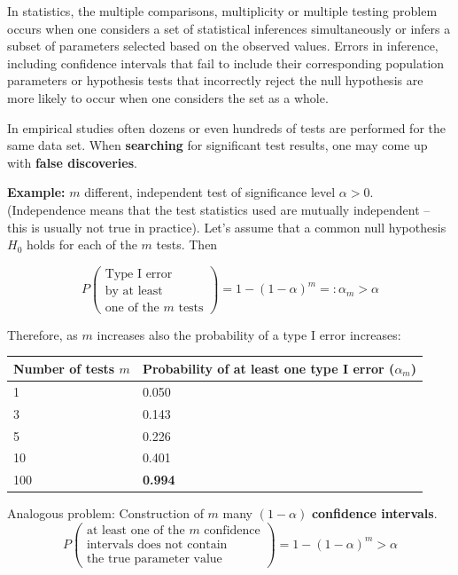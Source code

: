 \documentclass[]{book}
\theoremstyle{definition}
\theoremstyle{definition}
\theoremstyle{definition}
\theoremstyle{remark}
\begin{document}
In statistics, the multiple comparisons, multiplicity or multiple testing problem occurs when one considers a set of statistical inferences simultaneously or infers a subset of parameters selected based on the observed values. Errors in inference, including confidence intervals that fail to include their corresponding population parameters or hypothesis tests that incorrectly reject the null hypothesis are more likely to occur when one considers the set as a whole.

In empirical studies often dozens or even hundreds of tests are performed for the same data set. When \textbf{searching} for
significant test results, one may come up with \textbf{false discoveries}.

\textbf{Example:} \(m\) different, independent test of significance level \(\alpha>0\). (Independence means that the test statistics used are mutually independent -- this is usually not true in practice). Let's assume that a common null hypothesis \(H_0\) holds for each of the \(m\) tests. Then

\[
P \begin{pmatrix}
      \text{Type I error}\\
      \text{by at least} \\
      \text{one of the $m$ tests}
  \end{pmatrix}
= 1 - (1 - \alpha)^m =: \alpha_m>\alpha
\]

Therefore, as \(m\) increases also the probability of a type I error increases:

\begin{longtable}[]{@{}ll@{}}
\toprule
Number of tests \(m\) & Probability of at least one type I error (\(\alpha_m\))\tabularnewline
\midrule
\endhead
1 & 0.050\tabularnewline
3 & 0.143\tabularnewline
5 & 0.226\tabularnewline
10 & 0.401\tabularnewline
100 & \textbf{0.994}\tabularnewline
\bottomrule
\end{longtable}

Analogous problem: Construction of \(m\) many \((1-\alpha)\) \textbf{confidence intervals}.
\[
P \begin{pmatrix}
      \text{at least one of the $m$ confidence} \\
      \text{intervals does not contain} \\
      \text{the true parameter value} \end{pmatrix}
    = 1 - (1-\alpha)^m>\alpha
\]
\end{document}
